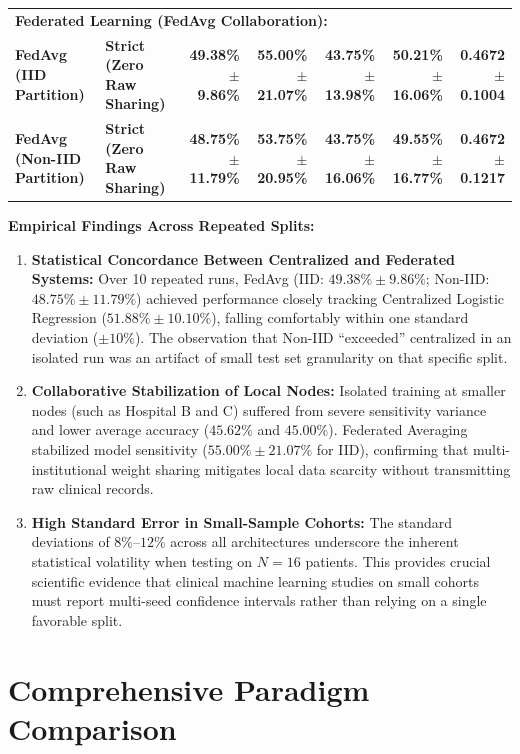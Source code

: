\documentclass[12pt,a4paper,oneside]{report}
\begin{document}
\begin{table}[htbp]
{\begin{tabular}{@{}llrrrrr@{}}
\multicolumn{7}{l}{\textbf{Federated Learning (FedAvg Collaboration):}} \\
\textbf{FedAvg (IID Partition)} & \textbf{Strict (Zero Raw Sharing)} & \textbf{49.38\% $\pm$ 9.86\%} & \textbf{55.00\% $\pm$ 21.07\%} & \textbf{43.75\% $\pm$ 13.98\%} & \textbf{50.21\% $\pm$ 16.06\%} & \textbf{0.4672 $\pm$ 0.1004} \\
\textbf{FedAvg (Non-IID Partition)} & \textbf{Strict (Zero Raw Sharing)} & \textbf{48.75\% $\pm$ 11.79\%} & \textbf{53.75\% $\pm$ 20.95\%} & \textbf{43.75\% $\pm$ 16.06\%} & \textbf{49.55\% $\pm$ 16.77\%} & \textbf{0.4672 $\pm$ 0.1217} \\ \bottomrule
\end{tabular}%
}
\end{table}

\noindent \textbf{Empirical Findings Across Repeated Splits:}
\begin{enumerate}
    \item \textbf{Statistical Concordance Between Centralized and Federated Systems:} Over 10 repeated runs, FedAvg (IID: $49.38\% \pm 9.86\%$; Non-IID: $48.75\% \pm 11.79\%$) achieved performance closely tracking Centralized Logistic Regression ($51.88\% \pm 10.10\%$), falling comfortably within one standard deviation ($\pm 10\%$). The observation that Non-IID ``exceeded'' centralized in an isolated run was an artifact of small test set granularity on that specific split.
    \item \textbf{Collaborative Stabilization of Local Nodes:} Isolated training at smaller nodes (such as Hospital B and C) suffered from severe sensitivity variance and lower average accuracy ($45.62\%$ and $45.00\%$). Federated Averaging stabilized model sensitivity ($55.00\% \pm 21.07\%$ for IID), confirming that multi-institutional weight sharing mitigates local data scarcity without transmitting raw clinical records.
    \item \textbf{High Standard Error in Small-Sample Cohorts:} The standard deviations of $8\%$--$12\%$ across all architectures underscore the inherent statistical volatility when testing on $N=16$ patients. This provides crucial scientific evidence that clinical machine learning studies on small cohorts must report multi-seed confidence intervals rather than relying on a single favorable split.
\end{enumerate}

\section{Comprehensive Paradigm Comparison}
\label{sec:paradigm_comparison}
\end{document}
